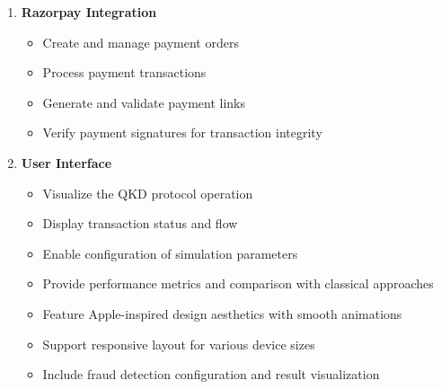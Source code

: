 \documentclass[conference]{IEEEtran}
\begin{document}
\begin{enumerate}
    \item \textbf{Razorpay Integration}
    \begin{itemize}
        \item Create and manage payment orders
        \item Process payment transactions
        \item Generate and validate payment links
        \item Verify payment signatures for transaction integrity
    \end{itemize}
    
    \item \textbf{User Interface}
    \begin{itemize}
        \item Visualize the QKD protocol operation
        \item Display transaction status and flow
        \item Enable configuration of simulation parameters
        \item Provide performance metrics and comparison with classical approaches
        \item Feature Apple-inspired design aesthetics with smooth animations
        \item Support responsive layout for various device sizes
        \item Include fraud detection configuration and result visualization
    \end{itemize}
\end{enumerate}
\end{document}

